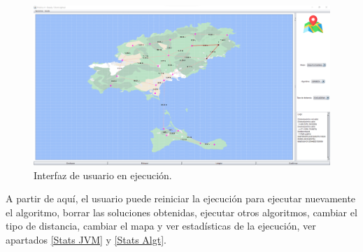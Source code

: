\begin{figure}[!h]
    \centering
    \includegraphics[width=\linewidth]{Usage/img/ejecucion.png}
    \caption{Interfaz de usuario en ejecución.}
    \label{fig:Ejemplo ejecución}
\end{figure}

A partir de aquí, el usuario puede reiniciar la ejecución para ejecutar nuevamente el algoritmo, borrar las soluciones obtenidas, ejecutar otros algoritmos, cambiar el tipo de distancia, cambiar el mapa y ver estadísticas de la ejecución, ver apartados \ref{Stats JVM} y \ref{Stats Algt}.
